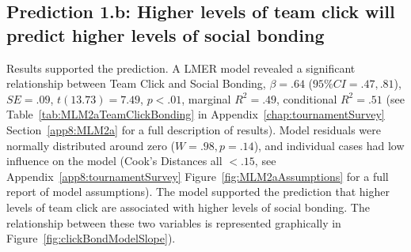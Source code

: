 \begin{CJK}{UTF8}{gbsn}









\subsection{Prediction 1.b: Higher levels of team click will predict higher levels of social bonding}

 Results supported the prediction.  A LMER model revealed a significant relationship between Team Click and Social Bonding, $\beta = .64$ ($95\% CI =  .47, .81$), $SE = .09$, $t(13.73) = 7.49$, $p < .01$, marginal $R^2 = .49$, conditional $R^2 = .51$ (see Table~\ref{tab:MLM2aTeamClickBonding} in Appendix~\ref{chap:tournamentSurvey} Section~\ref{app8:MLM2a} for a full description of results).  Model residuals were normally distributed around zero ($W = .98, p = .14$), and individual cases had low influence on the model (Cook's Distances all $< .15$, see Appendix~\ref{app8:tournamentSurvey} Figure~\ref{fig:MLM2aAssumptions} for a full report of model assumptions).  The model supported the prediction that higher levels of team click are associated with higher levels of social bonding.  The relationship between these two variables is represented graphically in Figure~\ref{fig:clickBondModelSlope}).


\end{CJK}
